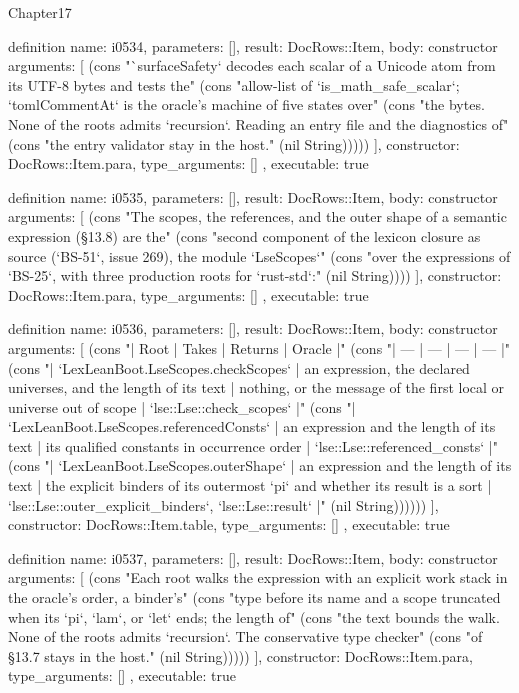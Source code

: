 \begin{lexlean}{Chapter17}
\begin{semanticmodule}
definition{
  name: i0534,
  parameters: [],
  result: DocRows::Item,
  body: constructor{
    arguments: [
      (cons "`surfaceSafety` decodes each scalar of a Unicode atom from its UTF-8 bytes and tests the" (cons "allow-list of `is_math_safe_scalar`; `tomlCommentAt` is the oracle's machine of five states over" (cons "the bytes. None of the roots admits `recursion`. Reading an entry file and the diagnostics of" (cons "the entry validator stay in the host." (nil String)))))
    ],
    constructor: DocRows::Item.para,
    type_arguments: []
  },
  executable: true
}

definition{
  name: i0535,
  parameters: [],
  result: DocRows::Item,
  body: constructor{
    arguments: [
      (cons "The scopes, the references, and the outer shape of a semantic expression (§13.8) are the" (cons "second component of the lexicon closure as source (`BS-51`, issue 269), the module `LseScopes`" (cons "over the expressions of `BS-25`, with three production roots for `rust-std`:" (nil String))))
    ],
    constructor: DocRows::Item.para,
    type_arguments: []
  },
  executable: true
}

definition{
  name: i0536,
  parameters: [],
  result: DocRows::Item,
  body: constructor{
    arguments: [
      (cons "| Root | Takes | Returns | Oracle |" (cons "| --- | --- | --- | --- |" (cons "| `LexLeanBoot.LseScopes.checkScopes` | an expression, the declared universes, and the length of its text | nothing, or the message of the first local or universe out of scope | `lse::Lse::check_scopes` |" (cons "| `LexLeanBoot.LseScopes.referencedConsts` | an expression and the length of its text | its qualified constants in occurrence order | `lse::Lse::referenced_consts` |" (cons "| `LexLeanBoot.LseScopes.outerShape` | an expression and the length of its text | the explicit binders of its outermost `pi` and whether its result is a sort | `lse::Lse::outer_explicit_binders`, `lse::Lse::result` |" (nil String))))))
    ],
    constructor: DocRows::Item.table,
    type_arguments: []
  },
  executable: true
}

definition{
  name: i0537,
  parameters: [],
  result: DocRows::Item,
  body: constructor{
    arguments: [
      (cons "Each root walks the expression with an explicit work stack in the oracle's order, a binder's" (cons "type before its name and a scope truncated when its `pi`, `lam`, or `let` ends; the length of" (cons "the text bounds the walk. None of the roots admits `recursion`. The conservative type checker" (cons "of §13.7 stays in the host." (nil String)))))
    ],
    constructor: DocRows::Item.para,
    type_arguments: []
  },
  executable: true
}


\end{semanticmodule}
\end{lexlean}
